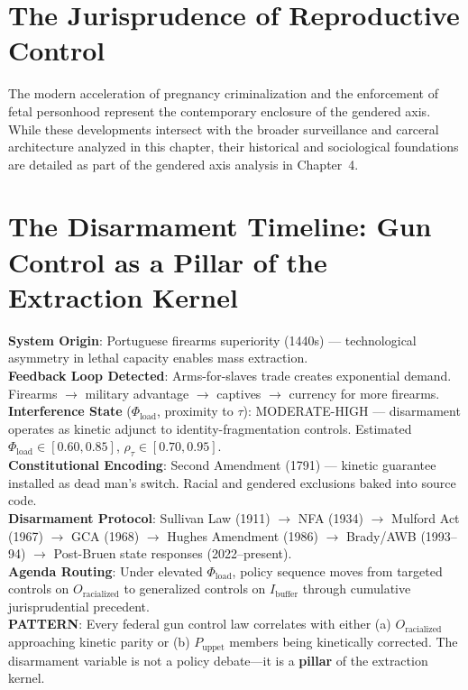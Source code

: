 \documentclass[12pt,openany]{book}
\begin{document}
\section{The Jurisprudence of Reproductive Control}

The modern acceleration of pregnancy criminalization and the enforcement of fetal personhood represent the contemporary enclosure of the gendered axis. While these developments intersect with the broader surveillance and carceral architecture analyzed in this chapter, their historical and sociological foundations are detailed as part of the gendered axis analysis in Chapter~4.

\section{The Disarmament Timeline: Gun Control as a Pillar of the Extraction Kernel}

\begin{tcolorbox}[colback=black!5, colframe=black!70, fonttitle=\bfseries\ttfamily, title=RUNTIME LOG: TRACING THE DISARMAMENT VARIABLE ACROSS THE FULL TIMELINE]
\ttfamily\small
\textbf{System Origin}: Portuguese firearms superiority (1440s) --- technological asymmetry in lethal capacity enables mass extraction.\\
\textbf{Feedback Loop Detected}: Arms-for-slaves trade creates exponential demand. Firearms $\rightarrow$ military advantage $\rightarrow$ captives $\rightarrow$ currency for more firearms.\\
\textbf{Interference State} ($\Phi_{\text{load}}$, proximity to $\tau$): MODERATE-HIGH --- disarmament operates as kinetic adjunct to identity-fragmentation controls. Estimated $\Phi_{\text{load}} \in [0.60, 0.85]$, $\rho_{\tau} \in [0.70, 0.95]$.\\
\textbf{Constitutional Encoding}: Second Amendment (1791) --- kinetic guarantee installed as dead man's switch. Racial and gendered exclusions baked into source code.\\
\textbf{Disarmament Protocol}: Sullivan Law (1911) $\rightarrow$ NFA (1934) $\rightarrow$ Mulford Act (1967) $\rightarrow$ GCA (1968) $\rightarrow$ Hughes Amendment (1986) $\rightarrow$ Brady/AWB (1993--94) $\rightarrow$ Post-Bruen state responses (2022--present).\\
\textbf{Agenda Routing}: Under elevated $\Phi_{\text{load}}$, policy sequence moves from targeted controls on $O_{\text{racialized}}$ to generalized controls on $I_{\text{buffer}}$ through cumulative jurisprudential precedent.\\
\textbf{PATTERN}: Every federal gun control law correlates with either (a) $O_{\text{racialized}}$ approaching kinetic parity or (b) $P_{\text{uppet}}$ members being kinetically corrected. The disarmament variable is not a policy debate---it is a \textbf{pillar} of the extraction kernel.
\end{tcolorbox}
\end{document}
